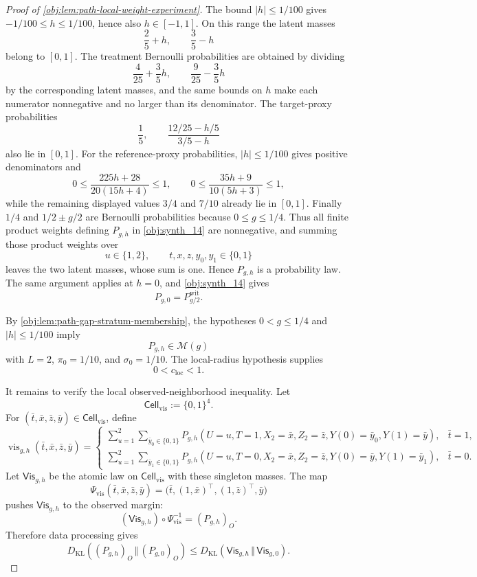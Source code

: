 \documentclass[11pt]{article}
\begin{document}
\begin{proof}[Proof of \cref{obj:lem:path-local-weight-experiment}]
The bound \(|h|\le 1/100\) gives \(-1/100\le h\le 1/100\), hence also \(h\in[-1,1]\).  On this range the latent masses
\[
\frac25+h,\qquad \frac35-h
\]
belong to \([0,1]\).  The treatment Bernoulli probabilities are obtained by dividing
\[
\frac4{25}+\frac35h,\qquad \frac9{25}-\frac35h
\]
by the corresponding latent masses, and the same bounds on \(h\) make each numerator nonnegative and no larger than its denominator.  The target-proxy probabilities
\[
\frac15,\qquad \frac{12/25-h/5}{3/5-h}
\]
also lie in \([0,1]\).  For the reference-proxy probabilities, \(|h|\le1/100\) gives positive denominators and
\[
0\le
\frac{225h+28}{20(15h+4)}
\le 1,
\qquad
0\le
\frac{35h+9}{10(5h+3)}
\le 1,
\]
while the remaining displayed values \(3/4\) and \(7/10\) already lie in \([0,1]\).  Finally \(1/4\) and \(1/2\pm g/2\) are Bernoulli probabilities because \(0\le g\le 1/4\).  Thus all finite product weights defining \(P_{g,h}\) in \cref{obj:synth_14} are nonnegative, and summing those product weights over
\[
u\in\{1,2\},\qquad t,x,z,y_0,y_1\in\{0,1\}
\]
leaves the two latent masses, whose sum is one.  Hence \(P_{g,h}\) is a probability law.  The same argument applies at \(h=0\), and \cref{obj:synth_14} gives
\[
P_{g,0}=P^{\mathrm{wit}}_{g/2}.
\] %

By \cref{obj:lem:path-gap-stratum-membership}, the hypotheses \(0<g\le 1/4\) and \(|h|\le 1/100\) imply
\[
P_{g,h}\in\mathcal M(g)
\]
with \(L=2\), \(\pi_0=1/10\), and \(\sigma_0=1/10\).  The local-radius hypothesis supplies
\[
0<c_{\mathrm{loc}}<1 .
\] %

It remains to verify the local observed-neighborhood inequality.  Let
\[
\mathsf{Cell}_{\mathrm{vis}}:=\{0,1\}^4 .
\]
For \((\bar t,\bar x,\bar z,\bar y)\in\mathsf{Cell}_{\mathrm{vis}}\), define
\[
\operatorname{vis}_{g,h}(\bar t,\bar x,\bar z,\bar y)
=
\begin{cases}
\displaystyle
\sum_{u=1}^{2}\sum_{\bar y_0\in\{0,1\}}
P_{g,h}(U=u,T=1,X_2=\bar x,Z_2=\bar z,Y(0)=\bar y_0,Y(1)=\bar y),
& \bar t=1,\\[0.9em]
\displaystyle
\sum_{u=1}^{2}\sum_{\bar y_1\in\{0,1\}}
P_{g,h}(U=u,T=0,X_2=\bar x,Z_2=\bar z,Y(0)=\bar y,Y(1)=\bar y_1),
& \bar t=0 .
\end{cases}
\]
Let \(\mathsf{Vis}_{g,h}\) be the atomic law on \(\mathsf{Cell}_{\mathrm{vis}}\) with these singleton masses.  The map
\[
\Psi_{\mathrm{vis}}(\bar t,\bar x,\bar z,\bar y)
=
\bigl(\bar t,(1,\bar x)^\top,(1,\bar z)^\top,\bar y\bigr)
\]
pushes \(\mathsf{Vis}_{g,h}\) to the observed margin:
\[
(\mathsf{Vis}_{g,h})\circ\Psi_{\mathrm{vis}}^{-1}=(P_{g,h})_O .
\]
Therefore data processing gives
\[
D_{\mathrm{KL}}\!\left((P_{g,h})_O\,\Vert\,(P_{g,0})_O\right)
\le
D_{\mathrm{KL}}\!\left(\mathsf{Vis}_{g,h}\,\Vert\,\mathsf{Vis}_{g,0}\right).
\] %


\end{proof}
\end{document}
